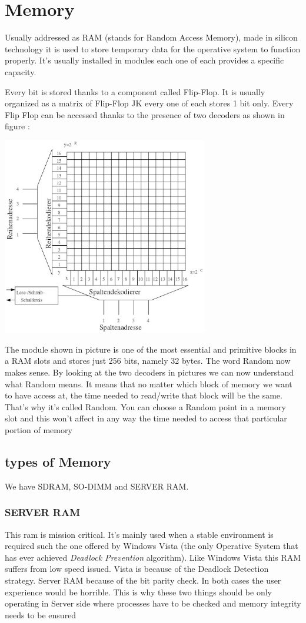 \documentclass[a4paper,12pt]{article}
\begin{document}
\section{Memory}

Usually addressed as RAM (stands for Random Access Memory), made in silicon technology it is used to store temporary data for the operative system to function properly. It's usually installed in modules each one of each provides a specific capacity.

Every bit is stored thanks to a component called Flip-Flop. It is usually organized as a matrix of Flip-Flop JK every one of each stores 1 bit only. Every Flip Flop can be accessed thanks to the presence of two decoders as shown in figure :
 
\includegraphics[width=9cm]{./DRAM-02.jpg}

The module shown in picture is one of the most essential and primitive blocks in a RAM slots and stores just 256 bits, namely 32 bytes. 
The word Random now makes sense. By looking at the two decoders in pictures we can now understand what Random means. It means that no matter which block of memory we want to have access at, the time needed to read/write that block will be the same. That's why it's called Random. You can choose a Random point in a memory slot and this won't affect in any way the time needed to access that particular portion of memory
\subsection{types of Memory}

We have SDRAM, SO-DIMM and SERVER RAM.

\subsubsection{SERVER RAM}
This ram is mission critical. It's mainly used when a stable environment is required such the one offered by Windows Vista (the only Operative System that has ever achieved \emph{Deadlock Prevention} algorithm).
Like Windows Vista this RAM suffers from low speed issued. Vista is because of the Deadlock Detection strategy. Server RAM because of the bit parity check. In both cases the user experience would be horrible. This is why these two things should be only operating in Server side where processes have to be checked and memory integrity needs to be ensured
\end{document}
